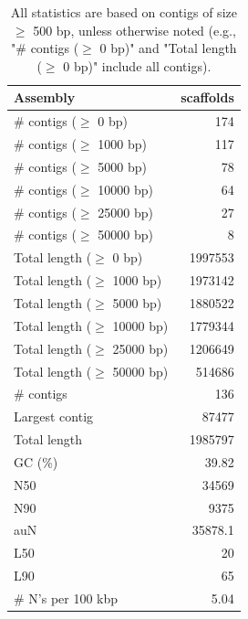 \documentclass[12pt,a4paper]{article}
\begin{document}
\begin{table}[ht]
\begin{center}
\caption{All statistics are based on contigs of size $\geq$ 500 bp, unless otherwise noted (e.g., "\# contigs ($\geq$ 0 bp)" and "Total length ($\geq$ 0 bp)" include all contigs).}
\begin{tabular}{|l*{1}{|r}|}
\hline
Assembly & scaffolds \\ \hline
\# contigs ($\geq$ 0 bp) & 174 \\ \hline
\# contigs ($\geq$ 1000 bp) & 117 \\ \hline
\# contigs ($\geq$ 5000 bp) & 78 \\ \hline
\# contigs ($\geq$ 10000 bp) & 64 \\ \hline
\# contigs ($\geq$ 25000 bp) & 27 \\ \hline
\# contigs ($\geq$ 50000 bp) & 8 \\ \hline
Total length ($\geq$ 0 bp) & 1997553 \\ \hline
Total length ($\geq$ 1000 bp) & 1973142 \\ \hline
Total length ($\geq$ 5000 bp) & 1880522 \\ \hline
Total length ($\geq$ 10000 bp) & 1779344 \\ \hline
Total length ($\geq$ 25000 bp) & 1206649 \\ \hline
Total length ($\geq$ 50000 bp) & 514686 \\ \hline
\# contigs & 136 \\ \hline
Largest contig & 87477 \\ \hline
Total length & 1985797 \\ \hline
GC (\%) & 39.82 \\ \hline
N50 & 34569 \\ \hline
N90 & 9375 \\ \hline
auN & 35878.1 \\ \hline
L50 & 20 \\ \hline
L90 & 65 \\ \hline
\# N's per 100 kbp & 5.04 \\ \hline
\end{tabular}
\end{center}
\end{table}
\end{document}
